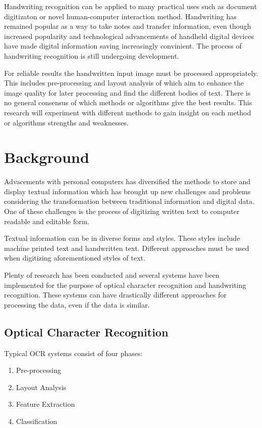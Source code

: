 \documentclass{article}
\begin{document}
    Handwriting recognition can be applied to many practical uses such as document digitizaton or novel human-computer interaction method. Handwriting has remained popular as a way to take notes and transfer information, even though increased popularity and technological advancements of handheld digital devices have made digital information saving increasingly convinient. The process of handwriting recognition is still undergoing development.

    For reliable results the handwritten input image must be processed appropriately. This includes pre-processing and layout analysis of which aim to enhance the image quality for later processing and find the different bodies of text. There is no general consensus of which methods or algorithms give the best results. This research will experiment with different methods to gain insight on each method or algorithms strengths and weaknesses.

  \newpage
  \section{Background}
    Advacements with personal computers has diversified the methods to store and display textual information which has brought up new challenges and problems considering the transformation between traditional information and digital data. One of these challenges is the process of digitizing written text to computer readable and editable form.

    Textual information can be in diverse forms and styles. These styles include machine printed text and handwritten text. Different approaches must be used when digitizing aforementioned styles of text.

    Plenty of research has been conducted and several systems have been implemented for the purpose of optical character recognition and handwriting recognition. These systems can have drastically different approaches for processing the data, even if the data is similar.

  \subsection{Optical Character Recognition}
    Typical OCR systems consist of four phases:
    \begin{enumerate}
      \item{Pre-processing}
      \item{Layout Analysis}
      \item{Feature Extraction}
      \item{Classification}
    \end{enumerate}
\end{document}
